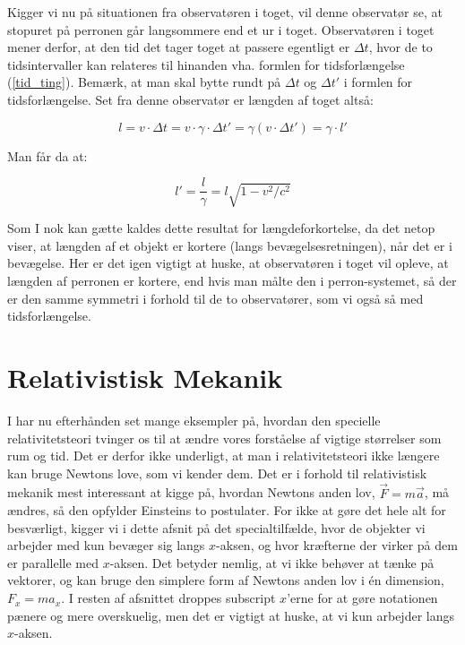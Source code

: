 Kigger vi nu på situationen fra observatøren i toget, vil denne observatør se, at stopuret på perronen går langsommere end et ur i toget. Observatøren i toget mener derfor, at den tid det tager toget at passere egentligt er $\Delta
t$, hvor de to tidsintervaller kan relateres til hinanden vha. formlen for tidsforlængelse (\ref{tid_ting}). Bemærk, at man skal bytte rundt på $\Delta t$ og $\Delta t'$ i formlen for tidsforlængelse. Set fra denne observatør er længden af toget altså:

$$l = v \cdot \Delta t = v \cdot \gamma \cdot \Delta t'  = \gamma  (v \cdot \Delta t') = \gamma \cdot l'$$

\vspace{2mm}

Man får da at:


\begin{equation}
l' = \frac{l}{\gamma} = l \sqrt{1 - v^2/c^2}
\label{lng_ting}
\end{equation}

\vspace{2mm}

Som I nok kan gætte kaldes dette resultat for længdeforkortelse, da det netop viser, at længden af et objekt er kortere (langs bevægelsesretningen), når det er i bevægelse. Her er det igen vigtigt at huske, at observatøren i toget vil opleve, at længden af perronen er kortere, end hvis man målte den i perron-systemet, så der er den samme symmetri i forhold til de to observatører, som vi også så med tidsforlængelse.\\ 

\section{Relativistisk Mekanik}

I har nu efterhånden set mange eksempler på, hvordan den specielle relativitetsteori tvinger os til at ændre vores forståelse af vigtige størrelser som rum og tid. Det er derfor ikke underligt, at man i relativitetsteori ikke længere kan bruge Newtons love, som vi kender dem. Det er i forhold til relativistisk mekanik mest interessant at kigge på, hvordan Newtons anden lov, $\vec{F} = m \vec{a}$, må ændres, så den opfylder Einsteins to postulater. For ikke at gøre det hele alt for besværligt, kigger vi i dette afsnit på det specialtilfælde, hvor de objekter vi arbejder med kun bevæger sig langs $x$-aksen, og hvor kræfterne der virker på dem er parallelle med $x$-aksen. Det betyder nemlig, at vi ikke behøver at tænke på vektorer, og kan bruge den simplere form af Newtons anden lov i én dimension, $F_x = ma_x$. I resten af afsnittet droppes subscript $x$'erne for at gøre notationen pænere og mere overskuelig, men det er vigtigt at huske, at vi kun arbejder langs $x$-aksen.\\

